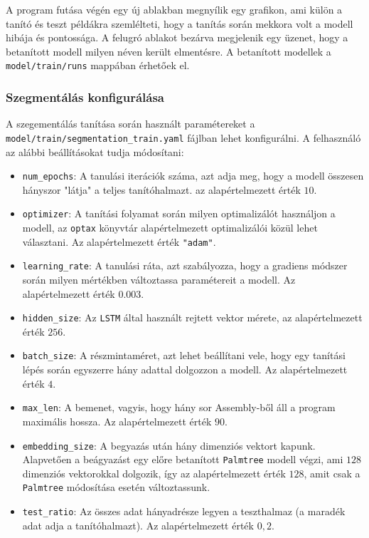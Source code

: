 A program futása végén egy új ablakban megnyílik egy grafikon, ami külön
a tanító és teszt példákra szemlélteti, hogy a tanítás során mekkora volt
a modell hibája és pontossága. A felugró ablakot bezárva megjelenik egy üzenet,
hogy a betanított modell milyen néven került elmentésre. A betanított
modellek a \texttt{model/train/runs} mappában érhetőek el. 

\subsubsection{Szegmentálás konfigurálása}

A szegementálás tanítása során használt paramétereket
a \texttt{model/train/segmentation\_train.yaml} fájlban lehet konfigurálni.
A felhasználó az alábbi beállításokat tudja módosítani:
\begin{itemize}
    \item \texttt{num\_epochs}: A tanulási iterációk száma, azt adja meg, hogy
        a modell összesen hányszor "látja" a teljes tanítóhalmazt. az
        alapértelmezett érték $10$.
    \item \texttt{optimizer}: A tanítási folyamat során milyen optimalizálót
        használjon a modell, az \texttt{optax}\cite{optax2020github} könyvtár
        alapértelmezett optimalizálói közül lehet választani. Az
        alapértelmezett érték \texttt{"adam"}\cite{adam}.
    \item \texttt{learning\_rate}: A tanulási ráta, azt szabályozza, hogy
    a gradiens módszer során milyen mértékben változtassa paramétereit
    a modell. Az alapértelmezett érték $0.003$.
    \item \texttt{hidden\_size}: Az \texttt{LSTM} által használt rejtett vektor
        mérete, az alapértelmezett érték $256$.
    \item \texttt{batch\_size}: A részmintaméret, azt lehet beállítani vele, hogy
        egy tanítási lépés során egyszerre hány adattal dolgozzon a modell. Az
        alapértelmezett érték $4$.
    \item \texttt{max\_len}: A bemenet, vagyis, hogy hány sor Assembly-ből áll
        a program maximális hossza. Az alapértelmezett érték $90$.
    \item \texttt{embedding\_size}: A begyazás után hány dimenziós vektort
        kapunk. Alapvetően a beágyazást egy előre betanított \texttt{Palmtree}
        modell végzi, ami $128$ dimenziós vektorokkal dolgozik, így az
        alapértelmezett érték $128$, amit csak a \texttt{Palmtree} módosítása
        esetén változtassunk.
    \item \texttt{test\_ratio}: Az összes adat hányadrésze legyen a teszthalmaz
        (a maradék adat adja a tanítóhalmazt). Az alapértelmezett érték $0,2$.
\end{itemize}

